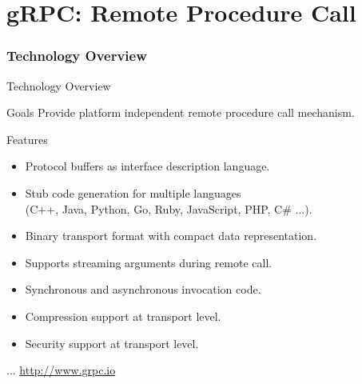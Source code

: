 \part{gRPC: Remote Procedure Call}


\section{Technology Overview}




\begin{frame}{Technology Overview}
    \begin{block}{Goals}
        Provide platform independent remote procedure call mechanism.
    \end{block}

    \bigskip

    \begin{block}{Features}
        \begin{itemize}
            \item Protocol buffers as interface description language.
            \item Stub code generation for multiple languages \\
                  (C++, Java, Python, Go, Ruby, JavaScript, PHP, C\# ...).
            \item Binary transport format with compact data representation.
            \item Supports streaming arguments during remote call.
            \item Synchronous and asynchronous invocation code.
            \item Compression support at transport level.
            \item Security support at transport level.
        \end{itemize}
    \end{block}

    \bigskip

    \hfill ... \url{http://www.grpc.io}
\end{frame}


